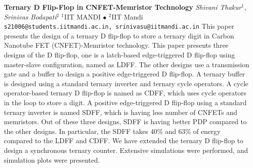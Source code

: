 
    \begin{conf-abstract}[]
        {\textbf{Ternary D Flip-Flop in CNFET-Memristor Technology}}
        {\textit{Shivani Thakur$^{1}$, Srinivas Bodapati$^{2}$}}
        {$^{1}$IIT MANDI $\bullet$ $^{2}$IIT Mandi}
        {\texttt{s21006@students.iitmandi.ac.in, srinivasu@iitmandi.ac.in}}
        {This paper presents the design of a ternary D flip-flop to store a ternary digit in Carbon Nanotube FET (CNFET)-Memristor technology. This paper presents three designs of the D flip-flop, one is a latch-based edge-triggered D flip-flop using master-slave configuration, named as LDFF. The other designs use a transmission gate and a buffer to design a positive edge-triggered D flip-flop. A ternary buffer is designed using a standard ternary inverter and ternary cycle operators. A cycle operator-based ternary D flip-flop is named as CDFF, which uses cycle operators in the loop to store a digit. A positive edge-triggered D flip-flop using a standard ternary inverter is named SDFF, which is having less number of CNFETs and memristors. Out of these three designs, SDFF is having better PDP compared to the other designs. In particular, the SDFF takes 40\% and 63\% of energy compared to the LDFF and CDFF. We have extended the ternary D flip-flop to design a synchronous ternary counter. Extensive simulations were performed, and simulation plots were presented. }
    \end{conf-abstract}
        